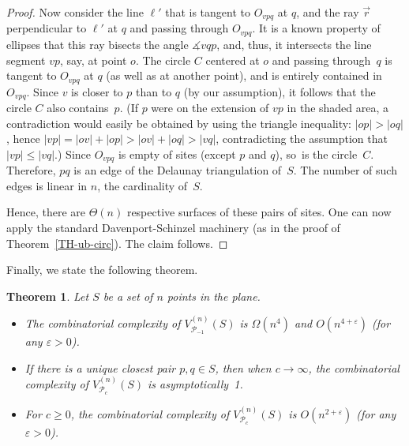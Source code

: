 \documentclass[10pt, conference, compsocconf]{IEEEtran}
\newtheorem{theorem}{Theorem}
\def\PP{{\mathcal P}}
\newcommand{\eps}{\varepsilon}
\begin{document}
\begin{proof}
   Now consider the line $\ell'$ that is tangent to $O_{vpq}$ at $q$, and
   the ray $\vec{r}$ perpendicular to $\ell'$ at $q$ and
   passing through $O_{vpq}$.  It is a known property of ellipses that
   this ray bisects the angle $\measuredangle{vqp}$, and, thus, it
   intersects the line segment $vp$, say, at point $o$.
   The circle $C$ centered at $o$ and passing through~$q$ is tangent to
   $O_{vpq}$ at $q$ (as well as at another point), and is entirely
   contained in $O_{vpq}$.  Since $v$ is closer to $p$ than to $q$ (by our
   assumption), it follows that the circle $C$ also contains~$p$.  (If $p$
   were on the extension of $vp$ in the shaded area, a contradiction would
   easily be obtained by using the triangle inequality:  $|op|>|oq|$, hence
   $|vp|=|ov|+|op|>|ov|+|oq|>|vq|$, contradicting the assumption that
   $|vp| \leq |vq|$.)  Since $O_{vpq}$ is empty of sites (except $p$ and $q$),
   so~is the circle~$C$.
   Therefore, $pq$ is an edge of the Delaunay triangulation of~$S$.
   The number of such edges is linear in $n$, the cardinality of~$S$.

   Hence, there are $\Theta(n)$ respective surfaces of these pairs of sites.
   One can now apply the standard Davenport-Schinzel machinery (as in the
   proof of Theorem~\ref{TH-ub-circ}).  The claim follows.
\end{proof}

Finally, we state the following theorem.

\begin{theorem}
   \label{TH-param-per}
   Let $S$ be a set of $n$ points in the plane.
   \begin{itemize}
   \item[(a)]
      The combinatorial complexity of $V_{\PP_{-1}}^{(n)}(S)$ is
      $\Omega(n^4)$ and $O(n^{4+\eps})$ (for any $\eps > 0$).
   \item[(b)]
      If there is a unique closest pair $p,q \in S$, then when
      $c \to \infty$, the combinatorial complexity of $V_{\PP_c}^{(n)}(S)$
      is asymptotically~1.
   \item[(c)]
      For $c \geq 0$, the combinatorial complexity of $V_{\PP_c}^{(n)}(S)$
      is $O(n^{2+\eps})$ (for any $\eps > 0$).
   \end{itemize}
\end{theorem}
\end{document}
